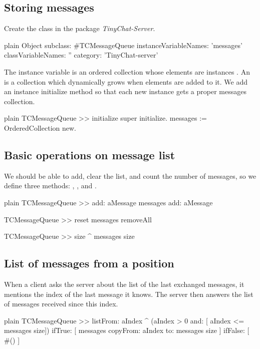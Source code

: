 \documentclass[10pt,twoside,english]{_support/latex/sbabook/sbabook}
\begin{document}
\subsection{Storing messages}
Create the class  in the package \textit{TinyChat-Server}. 

\begin{displaycode}{plain}
Object subclass: #TCMessageQueue
	instanceVariableNames: 'messages'
	classVariableNames: ''
	category: 'TinyChat-server'
\end{displaycode}

The  instance variable is an ordered collection whose elements are instances .
An  is a collection which dynamically grows when elements are added to it.
We add an instance initialize method so that each new instance gets a proper messages collection.

\begin{displaycode}{plain}
TCMessageQueue >> initialize
	super initialize.
	messages := OrderedCollection new.
\end{displaycode}
\subsection{Basic operations on message list }
We should be able to add, clear the list, and count the number of messages, so we define three methods: , , and .

\begin{displaycode}{plain}
TCMessageQueue >> add: aMessage
	messages add: aMessage 

TCMessageQueue >> reset
	messages removeAll

TCMessageQueue >> size
	^ messages size
\end{displaycode}
\subsection{List of messages from a position }
When a client asks the server about the list of the last exchanged messages, it mentions the index of the last
message it knows. The server then answers the list of messages received since this index.

\begin{displaycode}{plain}
TCMessageQueue >> listFrom: aIndex
	^ (aIndex > 0 and: [ aIndex <= messages size]) 
		ifTrue: [ messages copyFrom: aIndex to: messages size ]
		ifFalse: [ #() ]
\end{displaycode}
\end{document}
